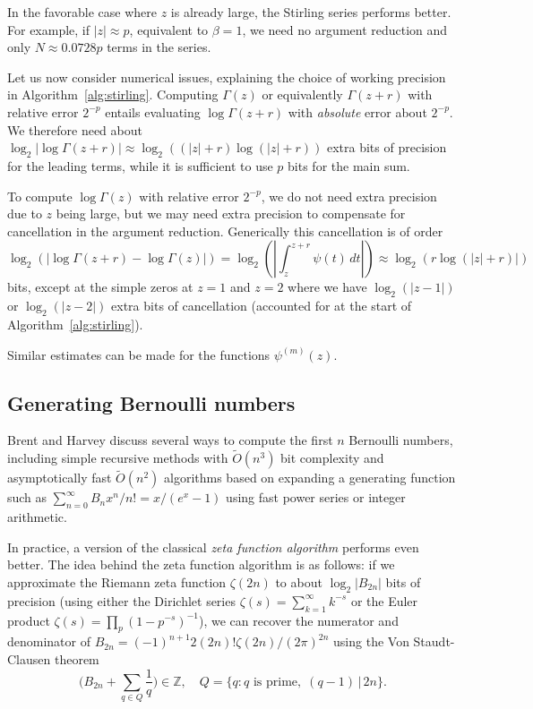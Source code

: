 \documentclass[reqno]{amsart}
\newcommand{\ZZ}{\mathbb{Z}}
\newcommand{\bigOtilde}{\widetilde O}
\theoremstyle{definition}
\begin{document}
In the favorable case where $z$ is already large, the Stirling series
performs better. For example, if $|z| \approx p$, equivalent
to $\beta = 1$, we need no argument reduction
and only $N \approx 0.0728 p$ terms in the series.

Let us now consider numerical issues,
explaining the choice of working precision in Algorithm~\ref{alg:stirling}.
Computing $\Gamma(z)$ or equivalently $\Gamma(z+r)$ with relative error $2^{-p}$ entails evaluating $\log \Gamma(z+r)$ with \emph{absolute} error about $2^{-p}$.
We therefore need about $\log_2 |\log \Gamma(z+r)| \approx \log_2((|z|+r) \log(|z|+r))$ extra bits of precision for
the leading terms, while it is sufficient to use $p$ bits for the main sum.

To compute $\log \Gamma(z)$ with relative error $2^{-p}$, we do not need extra precision due to $z$ being large,
but we may need extra precision to compensate for cancellation in the argument reduction.
Generically this cancellation is of order
\begin{equation}
\log_2(|\log \Gamma(z+r) - \log \Gamma(z)|) = \log_2\!\left(\left|\int_{z}^{z+r} \!\!\psi(t) \, dt\right|\right) \approx \log_2(r \log(|z|+r)|)
\end{equation}
bits, except at the simple zeros at $z = 1$ and $z = 2$
where we have $\log_2(|z-1|)$ or $\log_2(|z-2|)$ extra bits of cancellation (accounted for at the start of Algorithm~\ref{alg:stirling}).

Similar estimates can be made for the functions $\psi^{(m)}(z)$.

\subsection{Generating Bernoulli numbers}

\label{sect:genbern}

Brent and Harvey \cite{Brent2013} discuss
several ways to compute the first $n$ Bernoulli numbers,
including simple recursive methods with $\bigOtilde(n^3)$
bit complexity
and asymptotically fast $\bigOtilde(n^2)$ algorithms
based on expanding a generating function such as
$\sum_{n=0}^{\infty} B_n x^n / n! = x / (e^x - 1)$
using fast power series or integer arithmetic.

In practice, a version of the classical
\emph{zeta function algorithm} \cite{Chowla1972,fillebrown1992faster,Harvey2010} performs even better.
The idea behind the zeta function algorithm is as follows:
if we approximate the Riemann zeta function
$\zeta(2n)$ to about $\log_2 |B_{2n}|$ bits of precision
(using either the Dirichlet series
$\zeta(s) = \sum_{k=1}^{\infty} k^{-s}$ or the Euler product
$\zeta(s) = \prod_p (1 - p^{-s})^{-1}$),
we can recover the numerator and denominator of
$B_{2n} = (-1)^{n+1}2(2n)! \zeta(2n) / (2\pi)^{2n}$
using the Von Staudt-Clausen theorem
\begin{equation}
\Big( B_{2n} + \sum_{q \in Q} \frac{1}{q} \Big) \in \ZZ, \quad Q = \{ q : q \text{ is prime}, \; (q-1) \, | \, 2n \}.
\end{equation}
\end{document}
